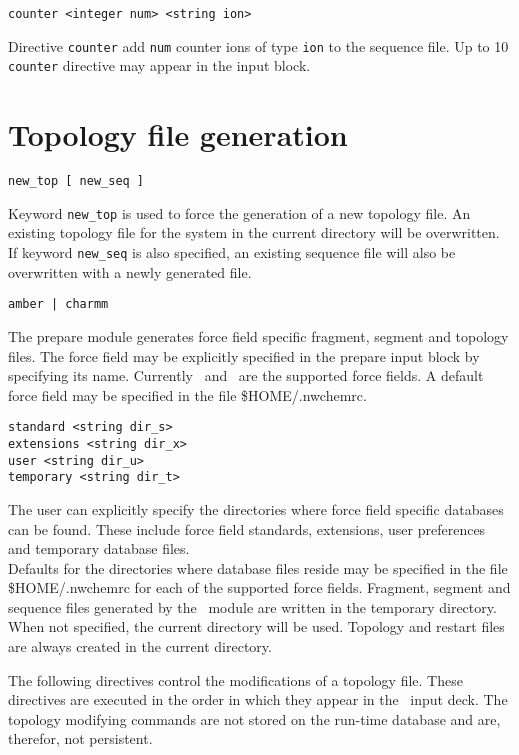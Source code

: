\begin{verbatim}
counter <integer num> <string ion>
\end{verbatim}

Directive \verb+counter+ add \verb+num+ counter ions of type
\verb+ion+ to the sequence file. Up to 10 \verb+counter+
directive may appear in the input block.

\section{Topology file generation}

\begin{verbatim}
new_top [ new_seq ]
\end{verbatim}

Keyword \verb+new_top+ is used to force the generation of a new topology 
file. An existing topology file for the system in the current directory
will be overwritten. If keyword \verb+new_seq+ is also specified, an
existing sequence file will also be overwritten with a newly generated
file.

\begin{verbatim}
amber | charmm
\end{verbatim}

The prepare module generates force field specific fragment, segment and 
topology files. The force field may be explicitly specified in the prepare 
input block by specifying its name.
Currently \amber\ and \charmm\ are the supported force fields.
A default force field may be specified in the file \$HOME/.nwchemrc. 

\begin{verbatim}
standard <string dir_s>
extensions <string dir_x>
user <string dir_u>
temporary <string dir_t>
\end{verbatim}

The user can explicitly specify the directories where force field
specific databases can be found. These include force field standards,
extensions, user preferences and temporary database files.\\
Defaults for the directories where database files reside may be specified 
in the file \$HOME/.nwchemrc for each of the supported force fields. 
Fragment, segment and sequence files generated by the \prepare\ module are 
written in the temporary directory. When not specified, the current 
directory will be used. 
Topology and restart files are always created in the current directory.


The following directives control the modifications of a
topology file. These directives are executed in the order in which 
they appear in the \prepare\ input deck. The topology modifying
commands are not stored on the run-time database and are, therefor,
not persistent.

